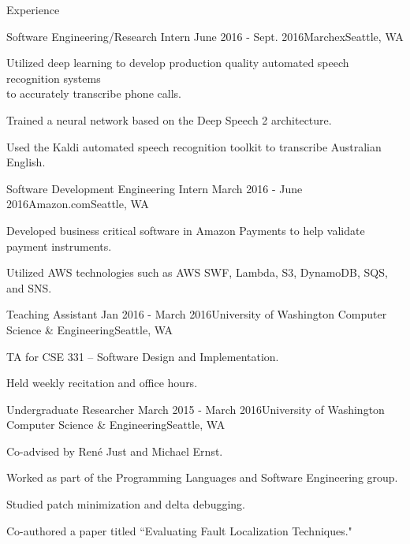 \documentclass{resume} %
\begin{document}
\begin{rSection}{Experience}

  \begin{rSubsection}{Software Engineering/Research Intern}
    {June 2016 - Sept. 2016}{Marchex}{Seattle, WA}
  \item Utilized deep learning to develop production quality automated speech recognition systems \\ to accurately transcribe phone calls.
  \item Trained a neural network based on the Deep Speech 2 architecture.
  \item Used the Kaldi automated speech recognition toolkit to transcribe Australian English.
  \end{rSubsection}

  \begin{rSubsection}{Software Development Engineering Intern}
    {March 2016 - June 2016}{Amazon.com}{Seattle, WA}
  \item Developed business critical software in Amazon Payments to help validate payment instruments.
  \item Utilized AWS technologies such as AWS SWF, Lambda, S3, DynamoDB, SQS, and SNS.
  \end{rSubsection}

  \begin{rSubsection}{Teaching Assistant}
    {Jan 2016 - March 2016}{University of Washington Computer Science \& Engineering}{Seattle, WA}
  \item TA for CSE 331 -- Software Design and Implementation.
  \item Held weekly recitation and office hours.
  \end{rSubsection}

  \begin{rSubsection}{Undergraduate Researcher}
    {March 2015 - March 2016}{University of Washington Computer Science \& Engineering}{Seattle, WA}
  \item Co-advised by Ren{\'e} Just and Michael Ernst.
  \item Worked as part of the Programming Languages and Software Engineering group.
  \item Studied patch minimization and delta debugging.
  \item Co-authored a paper titled ``Evaluating Fault Localization Techniques."

  \end{rSubsection}

\end{rSection}
\end{document}
